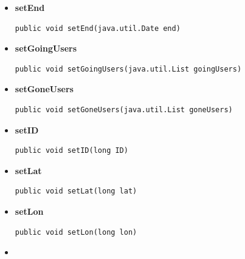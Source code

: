 \documentclass[11pt,a4paper]{report}
\begin{document}
{{{{\begin{itemize}
{\begin{lstlisting}[frame=none]
public void setDescription(java.lang.String description)\end{lstlisting} %
}%
\item{ 
\hypertarget{edu.kit.pse17.go_app.PersistenceLayer.GoEntity.setEnd(java.util.Date)}{{\bf  setEnd}\\}
\begin{lstlisting}[frame=none]
public void setEnd(java.util.Date end)\end{lstlisting} %
}%
\item{ 
\hypertarget{edu.kit.pse17.go_app.PersistenceLayer.GoEntity.setGoingUsers(java.util.List)}{{\bf  setGoingUsers}\\}
\begin{lstlisting}[frame=none]
public void setGoingUsers(java.util.List goingUsers)\end{lstlisting} %
}%
\item{ 
\hypertarget{edu.kit.pse17.go_app.PersistenceLayer.GoEntity.setGoneUsers(java.util.List)}{{\bf  setGoneUsers}\\}
\begin{lstlisting}[frame=none]
public void setGoneUsers(java.util.List goneUsers)\end{lstlisting} %
}%
\item{ 
\hypertarget{edu.kit.pse17.go_app.PersistenceLayer.GoEntity.setID(long)}{{\bf  setID}\\}
\begin{lstlisting}[frame=none]
public void setID(long ID)\end{lstlisting} %
}%
\item{ 
\hypertarget{edu.kit.pse17.go_app.PersistenceLayer.GoEntity.setLat(long)}{{\bf  setLat}\\}
\begin{lstlisting}[frame=none]
public void setLat(long lat)\end{lstlisting} %
}%
\item{ 
\hypertarget{edu.kit.pse17.go_app.PersistenceLayer.GoEntity.setLon(long)}{{\bf  setLon}\\}
\begin{lstlisting}[frame=none]
public void setLon(long lon)\end{lstlisting} %
}%
\item{ 
}
\end{itemize}}}}}
\end{document}
